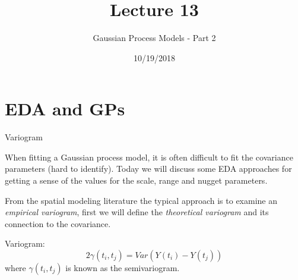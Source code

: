 \documentclass[11pt,ignorenonframetext,]{beamer}
\title{Lecture 13}
\subtitle{Gaussian Process Models - Part 2}
\date{10/19/2018}
\begin{document}
\frame{\titlepage}

\hypertarget{eda-and-gps}{%
\section{EDA and GPs}\label{eda-and-gps}}

\begin{frame}[t]{Variogram}
\protect\hypertarget{variogram}{}

When fitting a Gaussian process model, it is often difficult to fit the
covariance parameters (hard to identify). Today we will discuss some EDA
approaches for getting a sense of the values for the scale, range and
nugget parameters.

\pause

From the spatial modeling literature the typical approach is to examine
an \emph{empirical variogram}, first we will define the
\emph{theoretical variogram} and its connection to the covariance.

\vspace{2mm}

\pause

Variogram: \[
2 \gamma(t_i, t_j) = Var(Y(t_i) - Y(t_j))
\] where \(\gamma(t_i, t_j)\) is known as the semivariogram.

\end{frame}
\end{document}
